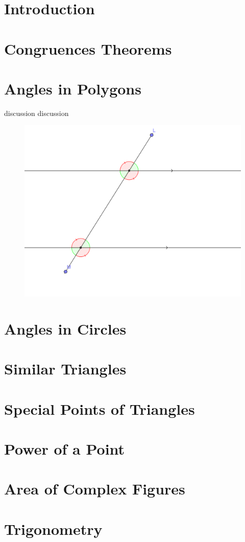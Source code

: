 \section{Introduction}

\clearpage

\section{Congruences Theorems}
\clearpage
\section{Angles in Polygons}
discussion discussion
\clearpage
\thispagestyle{empty}
\begin{figure}[h!]
	\centering\includegraphics[width=0.9\linewidth]{images/parallel.png}
\end{figure}


\clearpage

\section{Angles in Circles}
\clearpage
\section{Similar Triangles}
\clearpage
\section{Special Points of Triangles}
\clearpage
\section{Power of a Point}
\clearpage
\section{Area of Complex Figures}
\clearpage
\section{Trigonometry}






